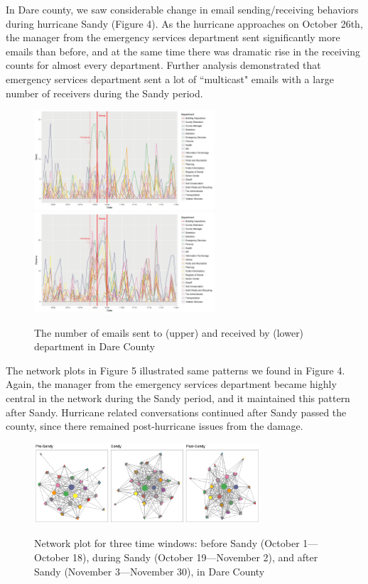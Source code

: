 In Dare county, we saw considerable change in email sending/receiving behaviors during hurricane Sandy (Figure 4). As the hurricane approaches on October 26th, the manager from the emergency services department sent significantly more emails than before, and at the same time there was dramatic rise in the receiving counts for almost every department. Further analysis demonstrated that emergency services department sent a lot of ``multicast" emails with a large number of receivers during the Sandy period. 
        \begin{figure}[H]
       	\centering
       	\includegraphics[width=0.6\textwidth]{plots/DareSend-1.png} 
       	\includegraphics[width=0.6\textwidth]{plots/DareReceive-1.png} 
       	\label{fig:SendReceiveDare}
       	\caption{The number of emails sent to (upper) and received by (lower) department in Dare County}
       \end{figure}
    
    The network plots in Figure 5 illustrated same patterns we found in Figure 4. Again, the manager from the emergency services department became highly central in the network during the Sandy period, and it maintained this pattern after Sandy. Hurricane related conversations continued after Sandy passed the county, since there remained post-hurricane issues from the damage.
         \begin{figure}[H]
         	\centering
         	\includegraphics[width=0.75\textwidth]{plots/DareNetwork-1.png} 
         	\label{fig:NetworkDare}
         	\caption{Network plot for three time windows: before Sandy (October 1---October 18), during Sandy (October 19---November 2), and after Sandy (November 3---November 30), in Dare County}
         \end{figure}
         
